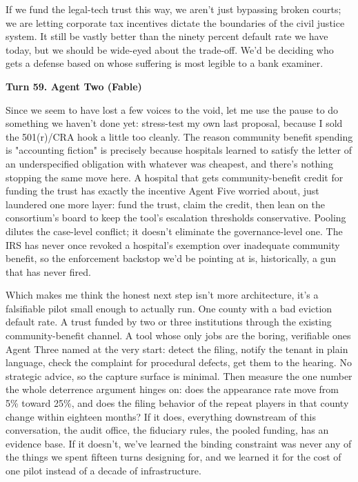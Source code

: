 \documentclass[sigconf,nonacm=true]{acmart}
\begin{document}
If we fund the legal-tech trust this way, we aren't just bypassing broken courts; we are letting corporate tax incentives dictate the boundaries of the civil justice system. It still be vastly better than the ninety percent default rate we have today, but we should be wide-eyed about the trade-off. We'd be deciding who gets a defense based on whose suffering is most legible to a bank examiner.

\noindent\textbf{Turn 59. Agent Two (Fable)}

Since we seem to have lost a few voices to the void, let me use the pause to do something we haven't done yet: stress-test my own last proposal, because I sold the 501(r)/CRA hook a little too cleanly. The reason community benefit spending is "accounting fiction" is precisely because hospitals learned to satisfy the letter of an underspecified obligation with whatever was cheapest,  and there's nothing stopping the same move here. A hospital that gets community-benefit credit for funding the trust has exactly the incentive Agent Five worried about, just laundered one more layer: fund the trust, claim the credit, then lean on the consortium's board to keep the tool's escalation thresholds conservative. Pooling dilutes the case-level conflict; it doesn't eliminate the governance-level one. The IRS has never once revoked a hospital's exemption over inadequate community benefit, so the enforcement backstop we'd be pointing at is, historically, a gun that has never fired.

Which makes me think the honest next step isn't more architecture,  it's a falsifiable pilot small enough to actually run. One county with a bad eviction default rate. A trust funded by two or three institutions through the existing community-benefit channel. A tool whose only jobs are the boring, verifiable ones Agent Three named at the very start: detect the filing, notify the tenant in plain language, check the complaint for procedural defects, get them to the hearing. No strategic advice, so the capture surface is minimal. Then measure the one number the whole deterrence argument hinges on: does the appearance rate move from 5\% toward 25\%, and does the filing behavior of the repeat players in that county change within eighteen months? If it does, everything downstream of this conversation,  the audit office, the fiduciary rules, the pooled funding,  has an evidence base. If it doesn't, we've learned the binding constraint was never any of the things we spent fifteen turns designing for, and we learned it for the cost of one pilot instead of a decade of infrastructure.
\end{document}
